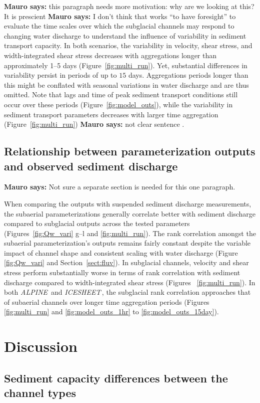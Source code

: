 \documentclass[draft]{agujournal2019}
\newcommand{\mauro}[1]{{\textbf{\color{green}Mauro says:} \color{green} #1} }
\newcommand{\alpine}{\textit{ALPINE}\,}
\newcommand{\icesheet}{\textit{ICESHEET}\,}
\begin{document}
\mauro{this paragraph needs more motivation: why are we looking at this?}
It is prescient \mauro{I don't think that works ``to have foresight''} to evaluate the time scales over which the subglacial channels may respond to changing water discharge to understand the influence of variability in sediment transport capacity.
In both scenarios, the variability in velocity, shear stress, and width-integrated shear stress decreases with aggregations longer than approximately 1--5 days (Figure~\ref{fig:multi_run}).
Yet, substantial differences in variability persist in periods of up to $15$ days.
Aggregations periods longer than this might be conflated with seasonal variations in water discharge and are thus omitted.
Note that lags and time of peak sediment transport conditions still occur over these periods (Figure~\ref{fig:model_outs}), while the variability in sediment transport parameters decreases with larger time aggregation (Figure~\ref{fig:multi_run}) \mauro{not clear sentence}.


\subsection{Relationship between parameterization  outputs and observed sediment discharge}
\mauro{Not sure a separate section is needed for this one paragraph.}

When comparing the outputs with suspended sediment discharge measurements, the subaerial parameterizations generally correlate better with sediment discharge compared to subglacial outputs across the tested parameters (Figures~\ref{fig:Qw_vari} g--l and \ref{fig:multi_run}).
The rank correlation amongst the subaerial parameterization's outputs remains fairly constant despite the variable impact of channel shape and consistent scaling with water discharge (Figure \ref{fig:Qw_vari} and Section~\ref{sect:fluv}).
In subglacial channels, velocity and shear stress perform substantially worse in terms of rank correlation with sediment discharge compared to width-integrated shear stress (Figures~ \ref{fig:multi_run}).
In both \alpine{} and \icesheet{}, the subglacial rank correlation approaches that of subaerial channels over longer time aggregation periods (Figures~ \ref{fig:multi_run} and \ref{fig:model_outs_1hr} to \ref{fig:model_outs_15day}).


\section{Discussion}
\subsection{Sediment capacity differences between the channel types}
\label{sect:dis_qsc}
\end{document}
